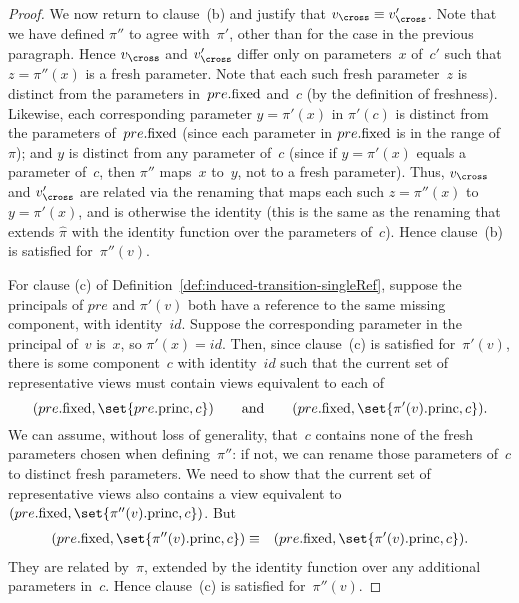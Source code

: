 \begin{proof}
We now return to clause~(b) and justify that $v_\cross \equiv v_\cross'$.
Note that we have defined $\pi''$ to agree with~$\pi'$, other than for the
case in the previous paragraph.  Hence $v_\cross$ and $v_\cross'$ differ only
on parameters~$x$ of~$c'$ such that $z = \pi''(x)$ is a fresh parameter.  Note
that each such fresh parameter~$z$ is distinct from the parameters
in~$pre.\mathrm{fixed}$ and~$c$ (by the definition of freshness).
%
Likewise, each corresponding parameter $y = \pi'(x)$ in $\pi'(c)$ is distinct
from the parameters of~$pre.\mathrm{fixed}$ (since each parameter in $pre.\mathrm{fixed}$ is
in the range of~$\pi$); and $y$ is distinct from any parameter of~$c$
(since if $y = \pi'(x)$ equals a parameter of~$c$, then $\pi''$ maps~$x$
to~$y$, not to a fresh parameter).
%
Thus, $v_\cross$ and $v_\cross'$ are related via the renaming that maps each
such $z = \pi''(x)$ to~$y = \pi'(x)$, and is otherwise the identity (this is
the same as the renaming that extends $\hat\pi$ with the identity function
over the parameters of~$c$).  Hence clause~(b) is satisfied for~$\pi''(v)$.

For clause (c) of Definition~\ref{def:induced-transition-singleRef}, suppose
the principals of $pre$ and $\pi'(v)$ both have a reference to the same
missing component, with identity~$id$.  Suppose the corresponding parameter in
the principal of~$v$ is~$x$, so $\pi'(x) = id$.  Then, since clause~(c) is
satisfied for~$\pi'(v)$, there is some component~$c$ with identity~$id$ such
that the current set of representative views must contain views equivalent to
each of
\[
(pre.\fixed, \set{pre.\princ, c}) \qquad\mbox{and}\qquad
(pre.\fixed, \set{\pi'(v).\princ, c}).
\]
We can assume, without loss of generality, that~$c$ contains none of the fresh
parameters chosen when defining~$\pi''$: if not, we can rename those
parameters of~$c$ to distinct fresh parameters.  We need to show that the
current set of representative views also contains a view equivalent to
$(pre.\fixed, \set{\pi''(v).\princ, c})$.  But
\begin{eqnarray*}
(pre.\fixed, \set{\pi''(v).\princ, c}) & \equiv & 
  (pre.\fixed, \set{\pi'(v).\princ, c}).
\end{eqnarray*}
They are related by~$\hat\pi$, extended by the identity function over any
additional parameters in~$c$.  Hence clause~(c) is satisfied for~$\pi''(v)$.
\end{proof}

